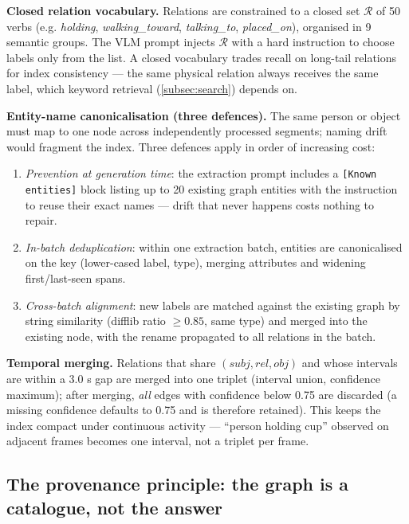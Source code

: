 \textbf{Closed relation vocabulary.} Relations are constrained to a closed set $\mathcal{R}$ of 50
verbs (e.g. \emph{holding}, \emph{walking\_toward}, \emph{talking\_to}, \emph{placed\_on}), organised in 9 semantic
groups. The VLM prompt injects $\mathcal{R}$ with a hard instruction to choose labels only from
the list. A closed vocabulary trades recall on long-tail relations for index consistency --- the
same physical relation always receives the same label, which keyword retrieval (\cref{subsec:search}) depends
on.

\textbf{Entity-name canonicalisation (three defences).} The same person or object must map to one node
across independently processed segments; naming drift would fragment the index. Three defences
apply in order of increasing cost:

\begin{enumerate}
  \item \emph{Prevention at generation time}: the extraction prompt includes a \texttt{[Known entities]} block
  listing up to 20 existing graph entities with the instruction to reuse their exact names ---
  drift that never happens costs nothing to repair.
  \item \emph{In-batch deduplication}: within one extraction batch, entities are canonicalised on the key
  (lower-cased label, type), merging attributes and widening first/last-seen spans.
  \item \emph{Cross-batch alignment}: new labels are matched against the existing graph by string
  similarity (difflib ratio $\geq 0.85$, same type) and merged into the existing node, with the
  rename propagated to all relations in the batch.
\end{enumerate}

\textbf{Temporal merging.} Relations that share $(\mathit{subj}, \mathit{rel}, \mathit{obj})$ and whose
intervals are within a 3.0 s gap are merged into one triplet (interval union, confidence maximum);
after merging, \emph{all} edges with confidence below 0.75 are discarded (a missing confidence defaults
to 0.75 and is therefore retained). This keeps the index compact under continuous
activity --- ``person holding cup'' observed on adjacent frames becomes one interval, not a triplet
per frame.

\subsection{The provenance principle: the graph is a catalogue, not the answer}
\label{subsec:provenance}


